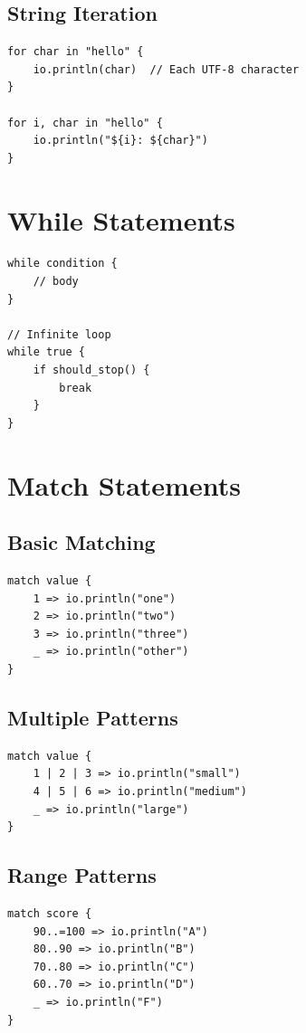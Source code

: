 \subsection{String Iteration}

\begin{lstlisting}
for char in "hello" {
    io.println(char)  // Each UTF-8 character
}

for i, char in "hello" {
    io.println("${i}: ${char}")
}
\end{lstlisting}

\section{While Statements}

\begin{lstlisting}
while condition {
    // body
}

// Infinite loop
while true {
    if should_stop() {
        break
    }
}
\end{lstlisting}

\section{Match Statements}

\subsection{Basic Matching}

\begin{lstlisting}
match value {
    1 => io.println("one")
    2 => io.println("two")
    3 => io.println("three")
    _ => io.println("other")
}
\end{lstlisting}

\subsection{Multiple Patterns}

\begin{lstlisting}
match value {
    1 | 2 | 3 => io.println("small")
    4 | 5 | 6 => io.println("medium")
    _ => io.println("large")
}
\end{lstlisting}

\subsection{Range Patterns}

\begin{lstlisting}
match score {
    90..=100 => io.println("A")
    80..90 => io.println("B")
    70..80 => io.println("C")
    60..70 => io.println("D")
    _ => io.println("F")
}
\end{lstlisting}

